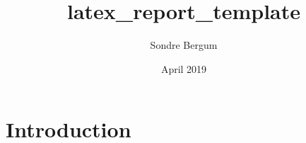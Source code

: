 \documentclass{article}
\title{latex_report_template}
\author{Sondre Bergum}
\date{April 2019}
\begin{document}
\maketitle

\section{Introduction}
\end{document}
